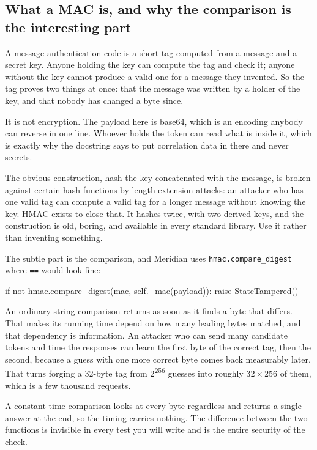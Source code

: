 \subsection{What a MAC is, and why the comparison is the interesting part}

A message authentication code is a short tag computed from a message and a
secret key. Anyone holding the key can compute the tag and check it; anyone
without the key cannot produce a valid one for a message they invented. So the
tag proves two things at once: that the message was written by a holder of the
key, and that nobody has changed a byte since.

It is not encryption. The payload here is base64, which is an encoding anybody can reverse in one
line. Whoever holds the token can read what is inside it, which is
exactly why the docstring says to put correlation data in there and never
secrets.

The obvious construction, hash the key concatenated with the message, is broken
against certain hash functions by length-extension attacks: an attacker who has
one valid tag can compute a valid tag for a longer message without knowing the
key. HMAC exists to close that. It hashes twice, with two derived keys, and the
construction is old, boring, and available in every standard library. Use it
rather than inventing something.

The subtle part is the comparison, and Meridian uses \texttt{hmac.compare\_digest} where \texttt{==} would look
fine:

\begin{py}
if not hmac.compare_digest(mac, self._mac(payload)):
    raise StateTampered()
\end{py}

An ordinary string comparison returns as soon as it finds a byte that differs.
That makes its running time depend on how many leading bytes matched, and that
dependency is information. An attacker who can send many candidate tokens and
time the responses can learn the first byte of the correct tag, then the second,
because a guess with one more correct byte comes back measurably later. That
turns forging a 32-byte tag from 2\textsuperscript{256} guesses into roughly
$32 \times 256$ of them, which is a few thousand requests.

A constant-time comparison looks at every byte regardless and returns a single
answer at the end, so the timing carries nothing. The difference between the two
functions is invisible in every test you will write and is the entire security
of the check.

